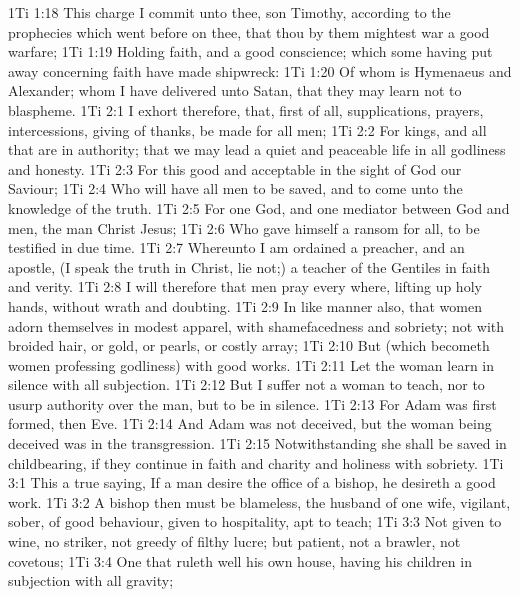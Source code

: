 \vs 1Ti 1:18 This charge I commit unto thee, son Timothy, according to the prophecies which went before on thee, that thou by them mightest war a good warfare;
\vs 1Ti 1:19 Holding faith, and a good conscience; which some having put away concerning faith have made shipwreck:
\vs 1Ti 1:20 Of whom is Hymenaeus and Alexander; whom I have delivered unto Satan, that they may learn not to blaspheme.
\vs 1Ti 2:1 I exhort therefore, that, first of all, supplications, prayers, intercessions,  giving of thanks, be made for all men;
\vs 1Ti 2:2 For kings, and  all that are in authority; that we may lead a quiet and peaceable life in all godliness and honesty.
\vs 1Ti 2:3 For this  good and acceptable in the sight of God our Saviour;
\vs 1Ti 2:4 Who will have all men to be saved, and to come unto the knowledge of the truth.
\vs 1Ti 2:5 For  one God, and one mediator between God and men, the man Christ Jesus;
\vs 1Ti 2:6 Who gave himself a ransom for all, to be testified in due time.
\vs 1Ti 2:7 Whereunto I am ordained a preacher, and an apostle, (I speak the truth in Christ,  lie not;) a teacher of the Gentiles in faith and verity.
\vs 1Ti 2:8 I will therefore that men pray every where, lifting up holy hands, without wrath and doubting.
\vs 1Ti 2:9 In like manner also, that women adorn themselves in modest apparel, with shamefacedness and sobriety; not with broided hair, or gold, or pearls, or costly array;
\vs 1Ti 2:10 But (which becometh women professing godliness) with good works.
\vs 1Ti 2:11 Let the woman learn in silence with all subjection.
\vs 1Ti 2:12 But I suffer not a woman to teach, nor to usurp authority over the man, but to be in silence.
\vs 1Ti 2:13 For Adam was first formed, then Eve.
\vs 1Ti 2:14 And Adam was not deceived, but the woman being deceived was in the transgression.
\vs 1Ti 2:15 Notwithstanding she shall be saved in childbearing, if they continue in faith and charity and holiness with sobriety.
\vs 1Ti 3:1 This  a true saying, If a man desire the office of a bishop, he desireth a good work.
\vs 1Ti 3:2 A bishop then must be blameless, the husband of one wife, vigilant, sober, of good behaviour, given to hospitality, apt to teach;
\vs 1Ti 3:3 Not given to wine, no striker, not greedy of filthy lucre; but patient, not a brawler, not covetous;
\vs 1Ti 3:4 One that ruleth well his own house, having his children in subjection with all gravity;
